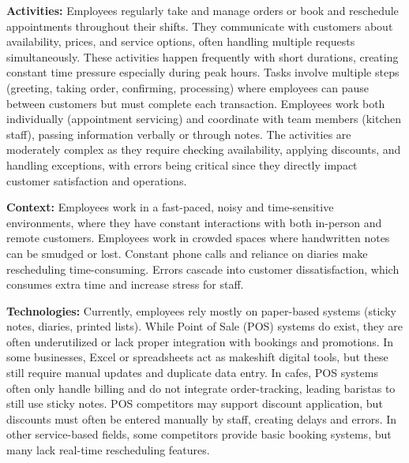 \documentclass[]{VUMIFTemplateClass}
\begin{document}
    \textbf{Activities:} Employees regularly take and manage orders or book and
    reschedule appointments throughout their shifts. They communicate with customers
    about availability, prices, and service options, often handling multiple
    requests simultaneously. These activities happen frequently with short
    durations, creating constant time pressure especially during peak hours. Tasks
    involve multiple steps (greeting, taking order, confirming, processing) where
    employees can pause between customers but must complete each transaction.
    Employees work both individually (appointment servicing) and coordinate with team members (kitchen staff), passing
    information verbally or through notes. The activities are moderately complex as
    they require checking availability, applying discounts, and handling exceptions,
    with errors being critical since they directly impact customer satisfaction and
    operations.
    
    \textbf{Context:} Employees work in a fast-paced, noisy and time-sensitive
environments, where they have constant interactions with both in-person and remote customers. Employees work in crowded spaces where handwritten notes can be smudged or lost. Constant phone calls and reliance on diaries make rescheduling time-consuming. Errors cascade into customer dissatisfaction, which consumes extra time and increase stress for staff.
    
    \textbf{Technologies:} Currently, employees rely mostly on paper-based systems (sticky notes, diaries, printed lists). While Point of Sale (POS) systems do exist, they are often underutilized or lack proper integration with bookings and promotions. In some businesses, Excel or spreadsheets act as makeshift digital tools, but these still require manual updates and duplicate data entry. In cafes, POS systems often only handle billing and do not integrate order-tracking, leading baristas to still use sticky notes. POS competitors may support discount application, but discounts must often be entered manually by staff, creating delays and errors. In other service-based fields, some competitors provide basic booking systems, but many lack real-time rescheduling features. 
\end{document}
